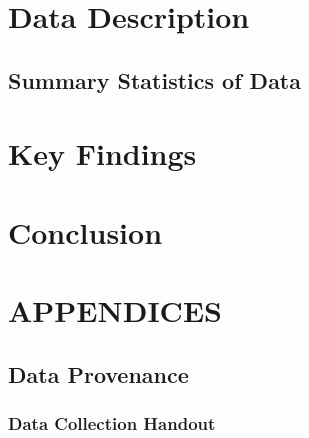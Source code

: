 \documentclass[]{article}
\begin{document}
\section{Data Description}
\label{sec:data}

\subsection{Summary Statistics of Data}
\label{sec:data-summary}



\section{Key Findings}
\label{sec:findings}

\section{Conclusion}
\label{sec:conclusion}

\section{APPENDICES}
\label{sec:appendix}

\subsection{Data Provenance}
\label{sec:appendix-data-provenance}

\subsubsection{Data Collection Handout}
\label{sec:appendix-data-handout}
\end{document}
